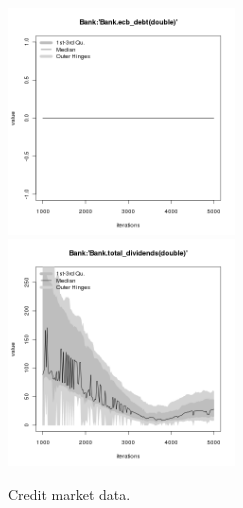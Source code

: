 \begin{figure}[H!]
\begin{minipage}{14cm}
\includegraphics[width=6cm]{./png/tax_0.10/Bank-ecb_debt.png}
\includegraphics[width=6cm]{./png/tax_0.10/Bank-total_dividends.png}
\end{minipage}
\caption{Credit market data.}
\label{Figure: Credit Market}
\end{figure}

%
